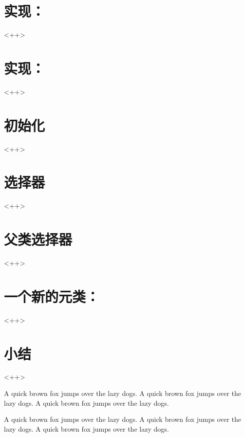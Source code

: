 \section{实现：}<++>

\section{实现：}<++>

\section{初始化}<++>

\section{选择器}<++>

\section{父类选择器}<++>

\section{一个新的元类：}<++>

\section{小结}<++>

A quick brown fox jumps over the lazy dogs.
A quick brown fox jumps over the lazy dogs.
A quick brown fox jumps over the lazy dogs.

A quick brown fox jumps over the lazy dogs.
A quick brown fox jumps over the lazy dogs.
A quick brown fox jumps over the lazy dogs.

\newpage{\thispagestyle{empty}\cleardoublepage}

